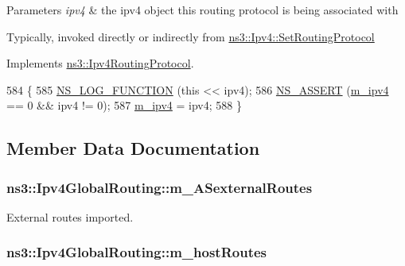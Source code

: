 \begin{DoxyParams}{Parameters}
{\em ipv4} & the ipv4 object this routing protocol is being associated with\\
\hline
\end{DoxyParams}
Typically, invoked directly or indirectly from \hyperlink{classns3_1_1Ipv4_a2d165c3bafd4ca580f02a03536db80d3}{ns3\+::\+Ipv4\+::\+Set\+Routing\+Protocol} 

Implements \hyperlink{classns3_1_1Ipv4RoutingProtocol_af3947a05b912ea3f2a1ef0e9777f723e}{ns3\+::\+Ipv4\+Routing\+Protocol}.


\begin{DoxyCode}
584 \{
585   \hyperlink{log-macros-disabled_8h_a90b90d5bad1f39cb1b64923ea94c0761}{NS\_LOG\_FUNCTION} (\textcolor{keyword}{this} << ipv4);
586   \hyperlink{assert_8h_a6dccdb0de9b252f60088ce281c49d052}{NS\_ASSERT} (\hyperlink{classns3_1_1Ipv4GlobalRouting_a8ca97d33982a32fa41a98b56dbec2edc}{m\_ipv4} == 0 && ipv4 != 0);
587   \hyperlink{classns3_1_1Ipv4GlobalRouting_a8ca97d33982a32fa41a98b56dbec2edc}{m\_ipv4} = ipv4;
588 \}
\end{DoxyCode}


\subsection{Member Data Documentation}
\subsubsection[{\texorpdfstring{m\+\_\+\+A\+Sexternal\+Routes}{m_ASexternalRoutes}}]{ ns3\+::\+Ipv4\+Global\+Routing\+::m\+\_\+\+A\+Sexternal\+Routes\hspace{0.3cm}{\ttfamily [private]}}\hypertarget{classns3_1_1Ipv4GlobalRouting_ad34f23b0d519a9603b6d9225185fc5ad}{}\label{classns3_1_1Ipv4GlobalRouting_ad34f23b0d519a9603b6d9225185fc5ad}


External routes imported. 

\subsubsection[{\texorpdfstring{m\+\_\+host\+Routes}{m_hostRoutes}}]{ ns3\+::\+Ipv4\+Global\+Routing\+::m\+\_\+host\+Routes\hspace{0.3cm}{\ttfamily [private]}}\hypertarget{classns3_1_1Ipv4GlobalRouting_adcef09fc8af430a93c9437edfc22511c}{}\label{classns3_1_1Ipv4GlobalRouting_adcef09fc8af430a93c9437edfc22511c}


